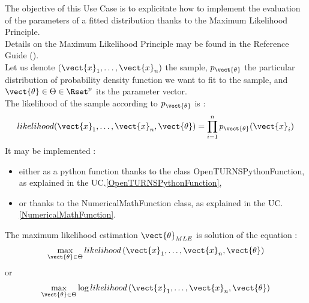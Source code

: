 \renewcommand{\filename}{docUC_InputWithData_MaxLikelihood.tex}
\renewcommand{\filetitle}{UC : Maximum likelihood of a given probability density function }

\HeaderIIILevel





The objective of this Use Case is to explicitate how to implement the evaluation of the parameters of a fitted distribution thanks to the Maximum Likelihood Principle.\\


Details on the Maximum Likelihood  Principle may be found in the Reference Guide ().\\

Let us denote $(\vect{x}_1, \dots, \vect{x}_n)$ the sample, $p_{\vect{\theta}}$ the particular distribution of probability density function we want to fit to the sample, and  $\vect{\theta} \in \Theta \in \Rset^p$ its the parameter vector.\\

The likelihood of the sample according to  $p_{\vect{\theta}}$ is :
\begin{align*}
  likelihood(\vect{x}_1, \dots, \vect{x}_n,\vect{\theta}) = \prod_{i=1}^n p_{\vect{\theta}}(\vect{x}_i)
\end{align*}
It may be implemented :
\begin{itemize}
\item either as a python function thanks to the class OpenTURNSPythonFunction, as explained in the UC.\ref{OpenTURNSPythonFunction},
\item or thanks to the NumericalMathFunction class, as explained in the UC.\ref{NumericalMathFunction}.
\end{itemize}

The maximum likelihood estimation $\vect{\theta}_{MLE}$ is solution of the equation :
\begin{align*}
  \max_{\vect{\theta} \in \Theta} likelihood\, (\vect{x}_1, \dots, \vect{x}_n,\vect{\theta})
\end{align*}
or
\begin{align*}
  \max_{\vect{\theta} \in \Theta}  \log likelihood\, (\vect{x}_1, \dots, \vect{x}_n,\vect{\theta})
\end{align*}


